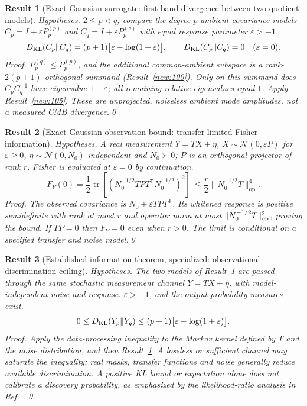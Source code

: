 \documentclass[aps,prd,onecolumn,notitlepage,groupedaddress,11pt]{revtex4-2}
\newtheorem{result}{Result}
\begin{document}
\begin{result}[\textsf{Exact Gaussian surrogate}: first-band divergence between two quotient models]\label{new:106}
\textit{Hypotheses.} $2\le p<q$; compare the degree-$p$ ambient covariance models $C_p=I+\varepsilon P_p^{(p)}$ and $C_q=I+\varepsilon P_p^{(q)}$ with equal response parameter $\varepsilon>-1$.
\begin{equation}\label{new:eq106}
D_{\rm KL}(C_p\Vert C_q)
=(p+1)\bigl[\varepsilon-\log(1+\varepsilon)\bigr],
\qquad D_{\rm KL}(C_p\Vert C_q)=0\quad(\varepsilon=0).
\end{equation}
\textit{Proof.} $P_p^{(q)}\le P_p^{(p)}$, and the additional common-ambient subspace is a rank-$2(p+1)$ orthogonal summand (Result~\ref{new:100}). Only on this summand does $C_pC_q^{-1}$ have eigenvalue $1+\varepsilon$; all remaining relative eigenvalues equal $1$. Apply Result~\ref{new:105}. These are unprojected, noiseless ambient mode amplitudes, not a measured CMB divergence.\qed
\end{result}

\begin{result}[\textsf{Exact Gaussian observation bound}: transfer-limited Fisher information]\label{new:107}
\textit{Hypotheses.} A real measurement $Y=TX+\eta$, $X\sim\mathcal N(0,\varepsilon P)$ for $\varepsilon\ge0$, $\eta\sim\mathcal N(0,N_0)$ independent and $N_0\succ0$; $P$ is an orthogonal projector of rank $r$. Fisher is evaluated at $\varepsilon=0$ by continuation.
\begin{equation}\label{new:eq107}
F_Y(0)=\frac12\operatorname{tr}\!\left[\left(N_0^{-1/2}TPT^{\mathsf T}N_0^{-1/2}\right)^2\right]
\ \le\frac r2\|N_0^{-1/2}T\|_{\mathrm{op}}^{4}.
\end{equation}
\textit{Proof.} The observed covariance is $N_0+\varepsilon TPT^{\mathsf T}$. Its whitened response is positive semidefinite with rank at most $r$ and operator norm at most $\|N_0^{-1/2}T\|_{\rm op}^2$, proving the bound. If $TP=0$ then $F_Y=0$ even when $r>0$. The limit is conditional on a specified transfer and noise model.\qed
\end{result}

\begin{result}[\textsf{Established information theorem, specialized}: observational discrimination ceiling]\label{new:108}
\textit{Hypotheses.} The two models of Result~\ref{new:106} are passed through the \emph{same} stochastic measurement channel $Y=TX+\eta$, with model-independent noise and response. $\varepsilon>-1$, and the output probability measures exist.
\begin{equation}\label{new:eq108}
0\le D_{\rm KL}(Y_p\Vert Y_q)
\le(p+1)\bigl[\varepsilon-\log(1+\varepsilon)\bigr].
\end{equation}
\textit{Proof.} Apply the data-processing inequality to the Markov kernel defined by $T$ and the noise distribution, and then Result~\ref{new:106}. A lossless or sufficient channel may saturate the inequality; real masks, transfer functions and noise generally reduce available discrimination. A positive KL bound or expectation alone does \emph{not} calibrate a discovery probability, as emphasized by the likelihood-ratio analysis in Ref.~\cite{COMPACT2026Detect}.\qed
\end{result}
\end{document}
